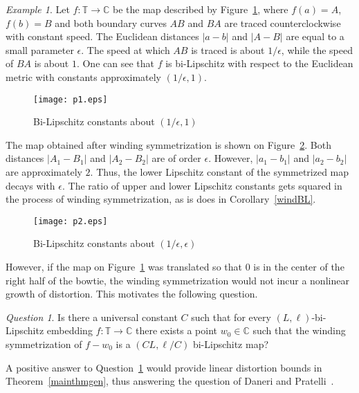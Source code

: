 \documentclass[11pt]{amsart}
\theoremstyle{remark}
\newtheorem{example}[theorem]{Example}
\newtheorem{question}[theorem]{Question}
\numberwithin{equation}{section}
\newcommand{\C}{\mathbb{C}}
\newcommand{\T}{\mathbb{T}}
\newcommand{\abs}[1]{\lvert#1\rvert}
\begin{document}
\begin{example} Let $f\colon \T\to\C$ be the map described by Figure~\ref{BeforeFigure}, where $f(a)=A$, $f(b)=B$ and both boundary curves $AB$ and $BA$ are traced counterclockwise with constant speed. The Euclidean distances $\abs{a-b}$ and $\abs{A-B}$ are equal to a small parameter $\epsilon$. The speed at which $AB$ is traced is about $1/\epsilon$, while the speed of $BA$ is about $1$. One can see that $f$ is bi-Lipschitz with respect to the Euclidean metric with constants approximately $(1/\epsilon, 1)$. 
\begin{figure}[ht]
\centering 
\texttt{[image: p1.eps]}
\caption{Bi-Lipschitz constants about $(1/\epsilon, 1)$} \label{BeforeFigure}
\end{figure} 

The map obtained after winding symmetrization is shown on Figure~\ref{AfterFigure}.  Both distances $\abs{A_1-B_1}$ and $\abs{A_2-B_2}$ are of order $\epsilon$. However, $\abs{a_1-b_1}$ and $\abs{a_2-b_2}$ are approximately $2$. Thus, the lower Lipschitz constant of the symmetrized map decays with $\epsilon$. The ratio of upper and lower Lipschitz constants gets squared in the process of winding  symmetrization, as is does in Corollary~\ref{windBL}.
\begin{figure}[ht]
\centering 
\texttt{[image: p2.eps]}
\caption{Bi-Lipschitz constants about $(1/\epsilon, \epsilon)$} \label{AfterFigure}
\end{figure} 
\end{example}

However, if the map on Figure~\ref{BeforeFigure} was translated so that $0$ is in the center of the right half of the bowtie, the winding symmetrization would not incur a nonlinear growth of distortion. This motivates the following question.

\begin{question}\label{optimistic} Is there a universal constant $C$ such that for every $(L,\ell)$-bi-Lipschitz embedding $f\colon \T\to\C$ there exists a point $w_0\in\C$ such that the winding symmetrization of $f-w_0$ is a $(C L, \ell/C)$ bi-Lipschitz map? 
\end{question}

A positive answer to Question~\ref{optimistic} would provide linear distortion bounds in Theorem~\ref{mainthmgen}, thus answering the question of Daneri and Pratelli~\cite{DP}. 
\end{document}
